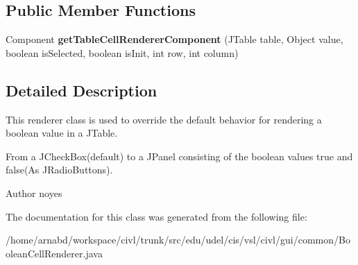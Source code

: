 \subsection*{Public Member Functions}
\begin{DoxyCompactItemize}
\item 
\hypertarget{classedu_1_1udel_1_1cis_1_1vsl_1_1civl_1_1gui_1_1common_1_1BooleanCellRenderer_a36d50439ec9e544e079696f667b8420a}{}Component {\bfseries get\+Table\+Cell\+Renderer\+Component} (J\+Table table, Object value, boolean is\+Selected, boolean is\+Init, int row, int column)\label{classedu_1_1udel_1_1cis_1_1vsl_1_1civl_1_1gui_1_1common_1_1BooleanCellRenderer_a36d50439ec9e544e079696f667b8420a}

\end{DoxyCompactItemize}


\subsection{Detailed Description}
This renderer class is used to override the default behavior for rendering a boolean value in a J\+Table. 

From a J\+Check\+Box(default) to a J\+Panel consisting of the boolean values true and false(\+As J\+Radio\+Buttons).

\begin{DoxyAuthor}{Author}
noyes 
\end{DoxyAuthor}


The documentation for this class was generated from the following file\+:\begin{DoxyCompactItemize}
\item 
/home/arnabd/workspace/civl/trunk/src/edu/udel/cis/vsl/civl/gui/common/Boolean\+Cell\+Renderer.\+java\end{DoxyCompactItemize}
